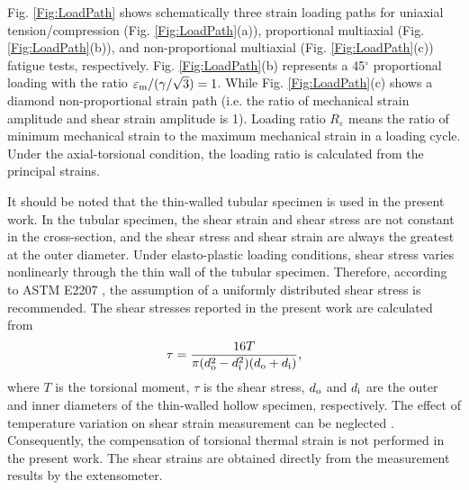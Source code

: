 \documentclass[preprint,5p,twocolumn,11pt,sort&compress]{elsarticle}
\begin{document}
Fig. \ref{Fig:LoadPath} shows schematically three strain loading paths for uniaxial tension/compression (Fig. \ref{Fig:LoadPath}(a)), proportional multiaxial (Fig. \ref{Fig:LoadPath}(b)), and non-proportional multiaxial (Fig. \ref{Fig:LoadPath}(c)) fatigue tests, respectively. Fig. \ref{Fig:LoadPath}(b) represents a 45$^\circ$ proportional loading with the ratio $\varepsilon_{\rm m}/(\gamma/\sqrt{3})=1$. While Fig. \ref{Fig:LoadPath}(c) shows a diamond non-proportional strain path (i.e. the ratio of mechanical strain amplitude and shear strain amplitude is 1). Loading ratio $R_\varepsilon$ means the ratio of minimum mechanical strain to the maximum mechanical strain in a loading cycle. Under the axial-torsional condition, the loading ratio is calculated from the principal strains. 

It should be noted that the thin-walled tubular specimen is used in the present work. In the tubular specimen, the shear strain and shear stress are not constant in the cross-section, and the shear stress and shear strain are always the greatest at the outer diameter. Under elasto-plastic loading conditions, shear stress varies nonlinearly through the thin wall of the tubular specimen. Therefore, according to ASTM E2207 \cite{ASTM2014}, the assumption of a uniformly distributed shear stress is recommended. The shear stresses reported in the present work are calculated from
\begin{equation}
\tau=\frac{16T}{\pi(d_{\rm o}^2-d_{\rm i}^2)(d_{\rm o}+d_{\rm i})},
\end{equation}
where $T$ is the torsional moment, $\tau$ is the shear stress, $d_{\rm o}$ and $d_{\rm i}$ are the outer and inner diameters of the thin-walled hollow specimen, respectively. The effect of temperature variation on shear strain measurement can be neglected \cite{Bakis2014}. Consequently, the compensation of torsional thermal strain is not performed in the present work. The shear strains are obtained directly from the measurement results by the extensometer.

\end{document}
